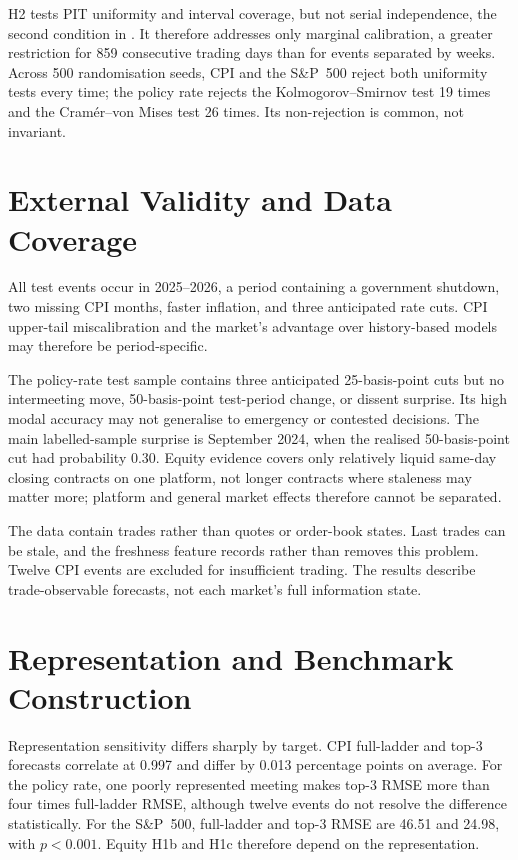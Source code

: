 \documentclass[12pt,a4paper]{report}
\begin{document}
H2 tests PIT uniformity and interval coverage, but not serial independence,
the second condition in \textcite{diebold1998}. It therefore addresses only
marginal calibration, a greater restriction for 859 consecutive trading days
than for events separated by weeks. Across 500 randomisation seeds, CPI and
the S\&P~500 reject both uniformity tests every time; the policy rate rejects
the Kolmogorov--Smirnov test 19 times and the Cram\'er--von Mises test 26 times.
Its non-rejection is common, not invariant.

\section{External Validity and Data Coverage}
\label{sec:limitations-external}

All test events occur in 2025--2026, a period containing a government
shutdown, two missing CPI months, faster inflation, and three anticipated rate
cuts. CPI upper-tail miscalibration and the market's advantage over
history-based models may therefore be period-specific.

The policy-rate test sample contains three anticipated 25-basis-point cuts but
no intermeeting move, 50-basis-point test-period change, or dissent surprise.
Its high modal accuracy may not generalise to emergency or contested
decisions. The main labelled-sample surprise is September 2024, when the
realised 50-basis-point cut had probability 0.30. Equity evidence covers only
relatively liquid same-day closing contracts on one platform, not longer
contracts where staleness may matter more; platform and general market effects
therefore cannot be separated.

The data contain trades rather than quotes or order-book states. Last trades
can be stale, and the freshness feature records rather than removes this
problem. Twelve CPI events are excluded for insufficient trading. The results
describe trade-observable forecasts, not each market's full information state.

\section{Representation and Benchmark Construction}
\label{sec:limitations-measurement}

Representation sensitivity differs sharply by target. CPI full-ladder and
top-3 forecasts correlate at 0.997 and differ by 0.013 percentage points on
average. For the policy rate, one poorly represented meeting makes top-3 RMSE
more than four times full-ladder RMSE, although twelve events do not resolve
the difference statistically. For the S\&P~500, full-ladder and top-3 RMSE are
46.51 and 24.98, with $p<0.001$. Equity H1b and H1c therefore depend on the
representation.
\end{document}
